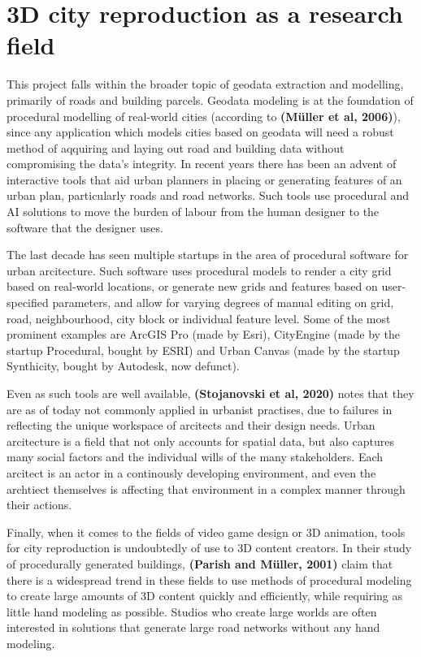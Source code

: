 \documentclass{kththesis}
\begin{document}
\section{3D city reproduction as a research field}

This project falls within the broader topic of geodata extraction and modelling, primarily of roads and building parcels.
Geodata modeling is at the foundation of procedural modelling of real-world cities (according to \textbf{(Müller et al, 2006)}), since any application which models cities based on geodata will need a robust method of aqquiring and laying out road and building data without compromising the data's integrity.
In recent years there has been an advent of interactive tools that aid urban planners in placing or generating features of an urban plan, particularly roads and road networks.
Such tools use procedural and AI solutions to move the burden of labour from the human designer to the software that the designer uses.

The last decade has seen multiple startups in the area of procedural software for urban arcitecture.
Such software uses procedural models to render a city grid based on real-world locations, or generate new grids and features based on user-specified parameters, and allow for varying degrees of manual editing on grid, road, neighbourhood, city block or individual feature level.
Some of the most prominent examples are ArcGIS Pro (made by Esri), CityEngine (made by the startup Procedural, bought by ESRI) and Urban Canvas (made by the startup Synthicity, bought by Autodesk, now defunct).

Even as such tools are well available, \textbf{(Stojanovski et al, 2020)} notes that they are as of today not commonly applied in urbanist practises, due to failures in reflecting the unique workspace of arcitects and their design needs.
Urban arcitecture is a field that not only accounts for spatial data, but also captures many social factors and the individual wills of the many stakeholders.
Each arcitect is an actor in a continously developing environment, and even the archtiect themselves is affecting that environment in a complex manner through their actions.

Finally, when it comes to the fields of video game design or 3D animation, tools for city reproduction is undoubtedly of use to 3D content creators.
In their study of procedurally generated buildings, \textbf{(Parish and Müller, 2001)} claim that there is a widespread trend in these fields to use methods of procedural modeling to create large amounts of 3D content quickly and efficiently, while requiring as little hand modeling as possible.
Studios who create large worlds are often interested in solutions that generate large road networks without any hand modeling.
\end{document}
